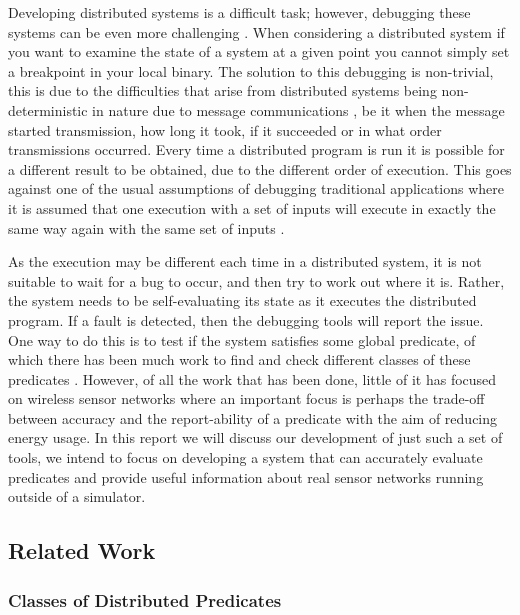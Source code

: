 Developing distributed systems is a difficult task; however, debugging these systems can be even more challenging \cite{345831}. When considering a distributed system if you want to examine the state of a system at a given point you cannot simply set a breakpoint in your local binary. The solution to this debugging is non-trivial, this is due to the difficulties that arise from distributed systems being non-deterministic in nature due to message communications \cite{1676929,Fagerstrom:1988:DTD:55823.55833}, be it when the message started transmission, how long it took, if it succeeded or in what order transmissions occurred. Every time a distributed program is run it is possible for a different result to be obtained, due to the different order of execution. This goes against one of the usual assumptions of debugging traditional applications where it is assumed that one execution with a set of inputs will execute in exactly the same way again with the same set of inputs \cite[Chapter~10]{lethbridge2001object}.

As the execution may be different each time in a distributed system, it is not suitable to wait for a bug to occur, and then try to work out where it is. Rather, the system needs to be self-evaluating its state as it executes the distributed program. If a fault is detected, then the debugging tools will report the issue. One way to do this is to test if the system satisfies some global predicate, of which there has been much work to find and check different classes of these predicates \cite{553309,345831,277788}. However, of all the work that has been done, little of it has focused on wireless sensor networks where an important focus is perhaps the trade-off between accuracy and the report-ability of a predicate with the aim of reducing energy usage. In this report we will discuss our development of just such a set of tools, we intend to focus on developing a system that can accurately evaluate predicates and provide useful information about real sensor networks running outside of a simulator.

\subsection{Related Work}

\subsubsection{Classes of Distributed Predicates}

